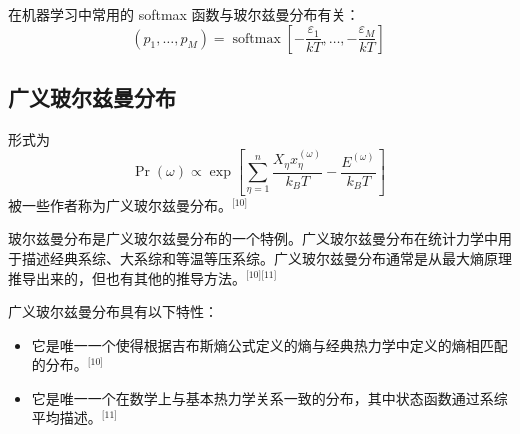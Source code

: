 在机器学习中常用的 softmax 函数与玻尔兹曼分布有关：
\[
(p_1, \ldots, p_M) = \operatorname{softmax} \left[ -\frac{\varepsilon_1}{kT}, \ldots, -\frac{\varepsilon_M}{kT} \right]~
\]
\subsection{广义玻尔兹曼分布}
形式为
\[
\Pr \left(\omega \right) \propto \exp \left[ \sum_{\eta =1}^{n} \frac{X_{\eta} x_{\eta}^{(\omega)}}{k_B T} - \frac{E^{(\omega)}}{k_B T} \right]~
\]
被一些作者称为广义玻尔兹曼分布。\(^\text{[10]}\)

玻尔兹曼分布是广义玻尔兹曼分布的一个特例。广义玻尔兹曼分布在统计力学中用于描述经典系综、大系综和等温等压系综。广义玻尔兹曼分布通常是从最大熵原理推导出来的，但也有其他的推导方法。\(^\text{[10][11]}\)

广义玻尔兹曼分布具有以下特性：
\begin{itemize}
\item 它是唯一一个使得根据吉布斯熵公式定义的熵与经典热力学中定义的熵相匹配的分布。\(^\text{[10]}\)
\item 它是唯一一个在数学上与基本热力学关系一致的分布，其中状态函数通过系综平均描述。\(^\text{[11]}\)
\end{itemize}